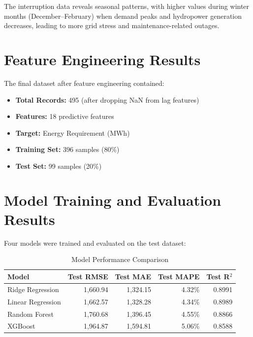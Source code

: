         The interruption data reveals seasonal patterns, with higher values during winter months (December--February) when demand peaks and hydropower generation decreases, leading to more grid stress and maintenance-related outages.
        \pagebreak

        \section{Feature Engineering Results}
        The final dataset after feature engineering contained:

        \begin{itemize}
            \item \textbf{Total Records:} 495 (after dropping NaN from lag features)
            \item \textbf{Features:} 18 predictive features
            \item \textbf{Target:} Energy Requirement (MWh)
            \item \textbf{Training Set:} 396 samples (80\%)
            \item \textbf{Test Set:} 99 samples (20\%)
        \end{itemize}

        \section{Model Training and Evaluation Results}
        Four models were trained and evaluated on the test dataset:

        \begin{table}[h]
                \begin{center}
                \begin{tabular}{|l|r|r|r|r|}
                \hline
                \textbf{Model} & \textbf{Test RMSE} & \textbf{Test MAE} & \textbf{Test MAPE} & \textbf{Test R$^2$} \\
                \hline
                Ridge Regression & 1,660.94 & 1,324.15 & 4.32\% & 0.8991 \\
                \hline
                Linear Regression & 1,662.57 & 1,328.28 & 4.34\% & 0.8989 \\
                \hline
                Random Forest & 1,760.68 & 1,396.45 & 4.55\% & 0.8866 \\
                \hline
                XGBoost & 1,964.87 & 1,594.81 & 5.06\% & 0.8588 \\
                \hline
                \end{tabular}
                \end{center}
                \caption{Model Performance Comparison}
        \end{table}

